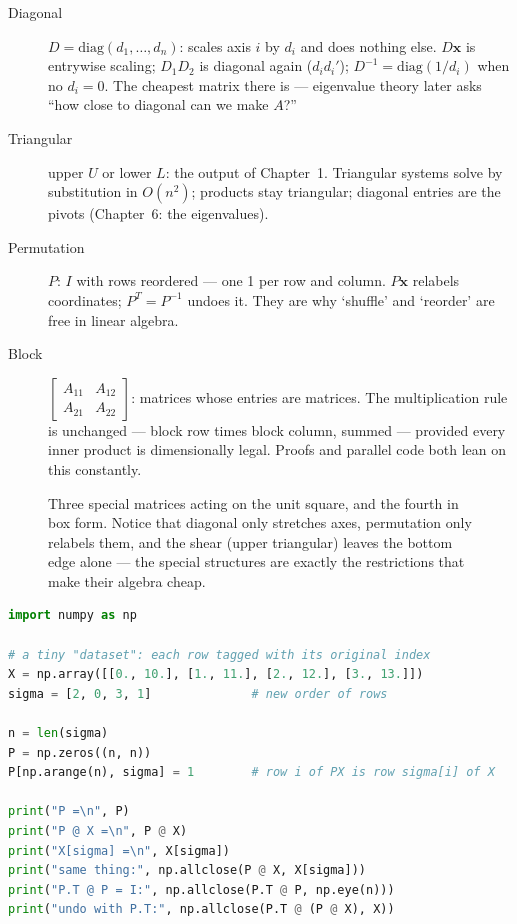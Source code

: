 \begin{description}
\item[Diagonal] $D=\mathrm{diag}(d_1,\dots,d_n)$: scales axis $i$ by $d_i$ and does nothing else. $D\mathbf{x}$ is entrywise scaling; $D_1D_2$ is diagonal again ($d_id_i'$); $D^{-1}=\mathrm{diag}(1/d_i)$ when no $d_i=0$. The cheapest matrix there is — eigenvalue theory later asks ``how close to diagonal can we make $A$?''
\item[Triangular] upper $U$ or lower $L$: the output of Chapter~1. Triangular systems solve by substitution in $O(n^2)$; products stay triangular; diagonal entries are the pivots (Chapter~6: the eigenvalues).
\item[Permutation] $P$: $I$ with rows reordered — one 1 per row and column. $P\mathbf{x}$ relabels coordinates; $P^{T}=P^{-1}$ undoes it. They are why `shuffle' and `reorder' are free in linear algebra.
\item[Block] $\begin{bmatrix}A_{11}&A_{12}\\A_{21}&A_{22}\end{bmatrix}$: matrices whose entries are matrices. The multiplication rule is unchanged — block row times block column, summed — provided every inner product is dimensionally legal. Proofs and parallel code both lean on this constantly.
\end{description}

\begin{figure}[htbp]
\centering

\caption{Three special matrices acting on the unit square, and the fourth in box form. Notice that diagonal only stretches axes, permutation only relabels them, and the shear (upper triangular) leaves the bottom edge alone — the special structures are exactly the restrictions that make their algebra cheap.}
\label{fig:gallery}
\end{figure}

\begin{lstlisting}[language=Python,caption={A permutation matrix is a reorder, and $P^{T}$ undoes it — the same trick a data loader uses when it shuffles sample order. File: \texttt{code/ch02\_permutation\_dataset.py}.},label={lst:perm}]
import numpy as np

# a tiny "dataset": each row tagged with its original index
X = np.array([[0., 10.], [1., 11.], [2., 12.], [3., 13.]])
sigma = [2, 0, 3, 1]              # new order of rows

n = len(sigma)
P = np.zeros((n, n))
P[np.arange(n), sigma] = 1        # row i of PX is row sigma[i] of X

print("P =\n", P)
print("P @ X =\n", P @ X)
print("X[sigma] =\n", X[sigma])
print("same thing:", np.allclose(P @ X, X[sigma]))
print("P.T @ P = I:", np.allclose(P.T @ P, np.eye(n)))
print("undo with P.T:", np.allclose(P.T @ (P @ X), X))
\end{lstlisting}

